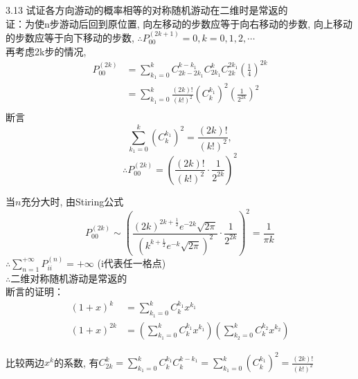 3.13 试证各方向游动的概率相等的对称随机游动在二维时是常返的%
\\%
证：为使n步游动后回到原位置, 向左移动的步数应等于向右移动的步数, 向上移动的步数应等于向下移动的步数, $\therefore P^{(2k+1)}_{00} = 0, k = 0, 1, 2,\cdots$\\
再考虑2k步的情况, \\
\[
\begin{split}
P^{(2k)}_{00} & = \sum^k_{k_1 = 0}C^{k-k_1}_{2k-2k_1}C^k_{2k_1}C^{2k_1}_{2k}\left(\frac{1}{4}\right)^{2k}\\
			& = \sum^k_{k_1 = 0}\frac{(2k)!}{(k!)^2}\left(C^{k_1}_k\right)^2\left(\frac{1}{2^{2k}}\right)^2\\
\end{split}
\]
断言
\[
\sum\limits^k_{k_1=0}\left(C^{k_1}_k\right)^2 = \frac{(2k)!}{(k!)^2},
\]
\[
\therefore P^{(2k)}_{00} = \left(\frac{(2k)!}{(k!)^2} \cdot \frac{1}{2^{2k}}\right)^2
\]

当$n$充分大时, 由Stiring公式
\[
P^{(2k)}_{00} \sim \left(\frac{(2k)^{2k+\frac{1}{2}} e^{-2k} \sqrt{2\pi}}{(k^{k+\frac{1}{2}} e^{-k} \sqrt{2\pi})^2} \cdot \frac{1}{2^{2k}}\right)^2 = \frac{1}{\pi k}
\]
$\therefore \sum\limits^{+\infty}_{n=1}P^{(n)}_{ii} = +\infty$   (i代表任一格点)\\
$\therefore $二维对称随机游动是常返的\\
断言的证明：
\begin{align*}
			(1+x)^k & = \sum^k_{k_1 = 0} C^{k_1}_k x^{k_1}\\
			(1+x)^{2k} & = \left(\sum^k_{k_1 = 0} C^{k_1}_k x^{k_1}\right)\left(\sum^k_{k_2 = 0} C^{k_2}_k x^{k_2}\right)
			\end{align*}

			比较两边$x^k$的系数, 有$C^k_{2k} = \sum\limits^k_{k_1 = 0} C^{k_1}_k C^{k-k_1}_k = \sum\limits^k_{k_1 = 0} \left(C^{k_1}_k\right)^2 = \frac{(2k)!}{(k!)^2}$



